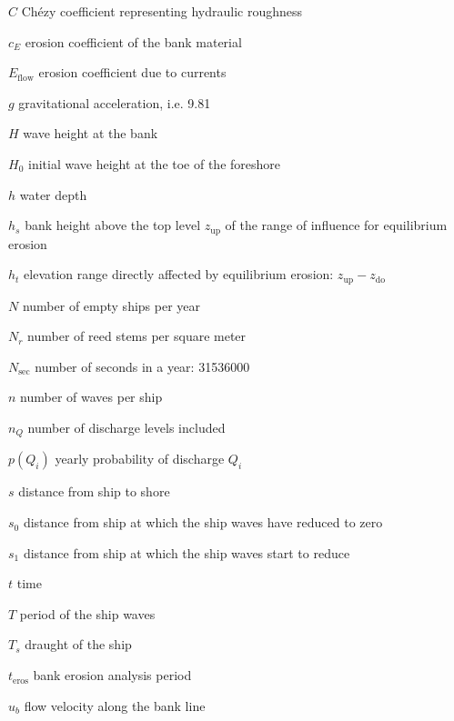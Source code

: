 \begin{symbollist}
\item[$C$] Ch\'ezy coefficient representing hydraulic roughness 
\item[$c_E$] erosion coefficient of the bank material 
\item[$E_\text{flow}$] erosion coefficient due to currents 
\item[$g$] gravitational acceleration, i.e. 9.81 
\item[$H$] wave height at the bank 
\item[$H_0$] initial wave height at the toe of the foreshore 
\item[$h$] water depth 
\item[$h_s$] bank height above the top level $z_\text{up}$ of the range of influence for equilibrium erosion 
\item[$h_t$] elevation range directly affected by equilibrium erosion: $z_\text{up} - z_\text{do}$ 
\item[$N$] number of empty ships per year 
\item[$N_r$] number of reed stems per square meter 
\item[$N_\text{sec}$] number of seconds in a year: 31536000 \unitbrackets{-}
\item[$n$] number of waves per ship \unitbrackets{-}
\item[$n_Q$] number of discharge levels included \unitbrackets{-}
\item[$p(Q_i)$] yearly probability of discharge $Q_i$ \unitbrackets{-}
\item[$s$] distance from ship to shore 
\item[$s_0$] distance from ship at which the ship waves have reduced to zero 
\item[$s_1$] distance from ship at which the ship waves start to reduce 
\item[$t$] time 
\item[$T$] period of the ship waves 
\item[$T_s$] draught of the ship 
\item[$t_\text{eros}$] bank erosion analysis period 
\item[$u_b$] flow velocity along the bank line 

\end{symbollist}
